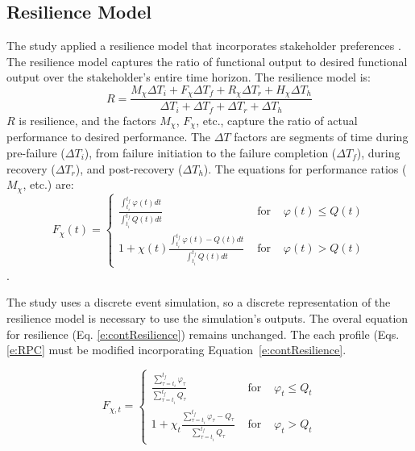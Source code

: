 \documentclass[preprint,12pt]{elsarticle}
\begin{document}
\subsection{Resilience Model}

The study applied a resilience model that incorporates
stakeholder preferences \cite{Ayyub2014a,Emanuel2017,Emanuel2018}.
The resilience model captures the ratio of functional
output to desired functional output over the stakeholder's entire time
horizon. The resilience model is:
\begin{equation}
  \label{e:contResilience}
    R = \frac{M_{\chi} \Delta T_i + F_{\chi} \Delta T_f + R_{\chi}
    \Delta T_r + H_{\chi} \Delta T_h}
  {\Delta T_i + \Delta T_f + \Delta T_r + \Delta T_h}
\end{equation}
$R$ is resilience, and the factors $M_{\chi}$, $F_{\chi}$, etc.,
capture the ratio of actual performance to desired performance. The
$\Delta T$ factors are segments of time during pre-failure ($\Delta
T_i$), from failure initiation to the failure completion ($\Delta
T_f$), during recovery ($\Delta T_r$), and post-recovery ($\Delta
T_h$).  The equations for performance ratios ($M_{\chi}$, etc.) are:
\begin{equation}
  \label{e:RPC}
  F_{\chi}(t) = \left\{\begin{array}{lcr}
      \frac{\displaystyle\int_{t_i}^{t_f}\varphi(t)dt}{\displaystyle\int_{t_i}^{t_f}Q(t)dt}
      & \text{ for } & \varphi(t) \leq Q(t) \\
      1 + \chi(t)
      \frac{\displaystyle\int_{t_i}^{t_f}\varphi(t)-Q(t)dt}{\displaystyle\int_{t_i}^{t_f}Q(t)dt}
      & \text{ for } & \varphi(t) > Q(t)
      \end{array}\right.
\end{equation}.


The study uses a discrete event simulation, so a discrete
representation of the resilience model is necessary to use the
simulation's outputs. The overal equation for resilience
(Eq. \ref{e:contResilience}) remains unchanged. The 
each profile (Eqs. \ref{e:RPC} must be modified incorporating
Equation~\ref{e:contResilience}.

\begin{equation}
% 
% 
  \label{e:RPD}
  F_{\chi,t} = \left\{\begin{array}{lcr}
    \frac{\displaystyle\sum_{\tau=t_{i}}^{t_f}\varphi_{\tau}}{\displaystyle\sum_{\tau=t_i}^{t_f}Q_{\tau}}
    & \text{ for } &
    \varphi_{t} \leq Q_t \\
      1 + \chi_t
      \frac{\displaystyle\sum_{\tau = t_i}^{t_f}\varphi_{\tau}-Q_{\tau}}{\displaystyle\sum_{\tau = t_i}^{t_f}Q_{\tau}}
      & \text{ for } &
      \varphi_{t} > Q_{t}
  \end{array}\right.
\end{equation}
\end{document}
